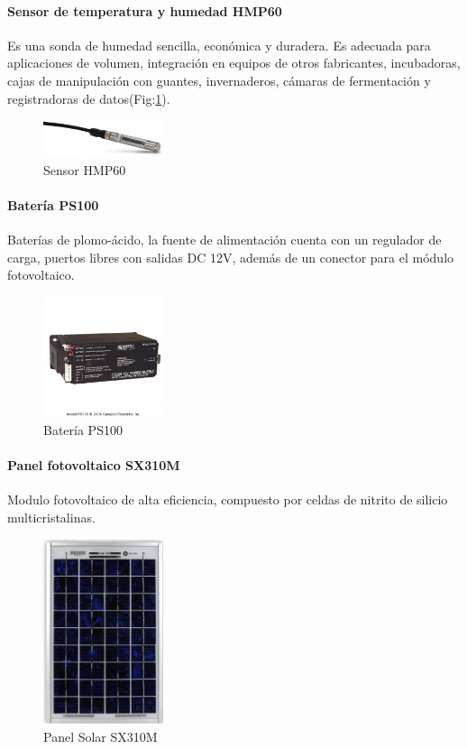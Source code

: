 \paragraph{Sensor de temperatura y humedad HMP60}
Es una sonda de humedad sencilla, económica y duradera. Es adecuada para aplicaciones de volumen, integración en equipos de otros fabricantes, incubadoras, cajas de manipulación con guantes, invernaderos, cámaras de fermentación y registradoras de datos(Fig:\ref{hr}).

\begin{figure}[h!]
        \centering
        \includegraphics[width=100pt]{images/SensorThmp60}
        \caption{Sensor HMP60}
	\label{hr}
\end{figure}

\paragraph{Batería PS100}
Baterías de plomo-ácido, la fuente de alimentación cuenta con un regulador de carga, puertos libres con salidas DC 12V, además de un conector para el módulo fotovoltaico.

\begin{figure}[h!]
        \centering
        \includegraphics[width=100pt]{images/bateria}
        \caption{Batería PS100} 
\end{figure}

\paragraph{Panel fotovoltaico SX310M}
Modulo fotovoltaico de alta eficiencia, compuesto por celdas de nitrito de silicio multicristalinas.

\begin{figure}[h!]
        \centering
        \includegraphics[width=100pt]{images/panelSolar}
        \caption{Panel Solar SX310M} 
\end{figure}

